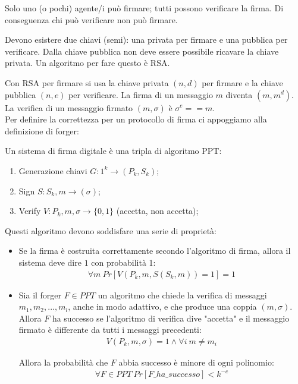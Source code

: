 \begin{definition}
    Solo uno (o pochi) agente/i può firmare; tutti possono verificare la firma. Di conseguenza chi può verificare non può firmare. 
\end{definition}

\noindent Devono esistere due chiavi (semi): una privata per firmare e una pubblica per verificare. Dalla chiave pubblica non deve essere possibile ricavare la chiave privata. Un algoritmo per fare questo è RSA. 

Con RSA per firmare si usa la chiave privata $(n, d)$ per firmare e la chiave pubblica $(n, e)$ per verificare. La firma di un messaggio $m$ diventa $(m, m^d)$. La verifica di un messaggio firmato $(m, \sigma )$ è $\sigma^e == m$.
\\

\noindent Per definire la correttezza per un protocollo di firma ci appoggiamo alla definizione di forger:
\begin{definition}
    Un sistema di firma digitale è una tripla di algoritmo PPT:
    \begin{enumerate}
        \item Generazione chiavi $G: 1^k \rightarrow (P_k, S_k)$;
        \item Sign $S: S_k, m \rightarrow (\sigma)$;
        \item Verify $V: P_k, m, \sigma \rightarrow \{0, 1\}$ (accetta, non accetta);
    \end{enumerate}
\end{definition}

\noindent Questi algoritmo devono soddisfare una serie di proprietà:
\begin{itemize}
    \item Se la firma è costruita correttamente secondo l'algoritmo di firma, allora il sistema deve dire $1$ con probabilità 1:
    \begin{align*}
        \forall m \ Pr[V(P_k, m, S(S_k, m)) = 1] = 1
    \end{align*}

    \item Sia il forger $F \in PPT$ un algoritmo che chiede la verifica di messaggi $m_1, m_2, ..., m_l$, anche in modo adattivo, e che produce una coppia $(m, \sigma)$. Allora $F$ ha successo se l'algoritmo di verifica dive "accetta" e il messaggio firmato è differente da tutti i messaggi precedenti:
    \begin{align*}
        V(P_k, m, \sigma) = 1 \land \forall i \ m \ne m_i
    \end{align*}

    Allora la probabilità che $F$ abbia successo è minore di ogni polinomio:
    \begin{align*}
        \forall F \in PPT \ Pr[F\_ha\_successo] < k^{-c}
    \end{align*}
\end{itemize}

